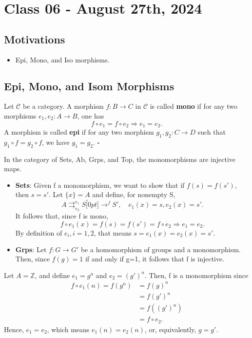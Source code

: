 \documentclass[../category_theory.tex]{subfiles}
\begin{document}
\section{Class 06 - August 27th, 2024}
\subsection{Motivations}
\begin{itemize}
	\item Epi, Mono, and Iso morphisms.
\end{itemize}
\subsection{Epi, Mono, and Isom Morphisms}
\begin{def*}
	Let \(\mathcal{C}\) be a category. A morphism \(f:B\rightarrow C\) in \(\mathcal{C}\) is called \textbf{mono} if for any two morphisms \(e_1, e_2:A\rightarrow B\), one has
	\[
		f\circ e_1=f\circ e_2 \Rightarrow e_1=e_2.
	\]
	A morphism is called \textbf{epi} if for any two morphism \(g_1, g_2:C\rightarrow D\) such that \(g_1\circ f = g_2\circ f\), we have \(g_1=g_2\). \(\square\)
\end{def*}
\begin{example}
	In the category of Sets, Ab, Grps, and Top, the monomorphisms are injective maps.
	\begin{itemize}
		\item \textbf{Sets}: Given f a monomorphism, we want to show that if \(f(s)=f(s'),\) then \(s=s'\). Let \(\{x\} = A\) and define, for nonempty S,
		      \[
			      A\rightrightarrows_{e_2}^{e_1}S\overbracket[0pt]{\rightarrow}^{f} S',\quad e_1(x)=s, e_2(x)=s'.
		      \]
		      It follows that, since f is mono,
		      \[
			      f\circ e_1(x)=f(s)=f(s')=f\circ e_2 \Rightarrow e_1 = e_2.
		      \]
		      By definition of \(e_{i}, i=1,2\), that means \(s=e_1(x)=e_2(x)=s'.\)
		\item \textbf{Grps}: Let \(f:G\rightarrow G'\) be a homomorphism of groups and a monomorphism. Then, since \(f(g)=1\) if and only if g=1, it follows that f is injective.
	\end{itemize}
\end{example}
\begin{example}
	Let \(A=\mathbb{Z}\), and define \(e_1=g^{n}\) and \(e_2=(g')^{n}\). Then, f is a monomorphism since
	\begin{align*}
		f\circ e_1(n)=f(g^{n}) & =f(g)^{n}    \\
		                       & =f(g')^{n}   \\
		                       & =f((g')^{n}) \\
		                       & =f\circ e_2.
	\end{align*}
	Hence, \(e_1=e_2\), which means \(e_1(n)=e_2(n)\), or, equivalently, \(g=g'\).
\end{example}
\end{document}
